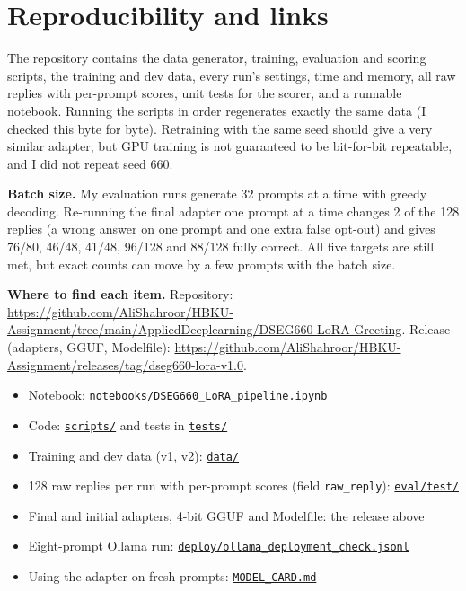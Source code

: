 \documentclass[11pt]{article}
\begin{document}
\section{Reproducibility and links}
The repository contains the data generator, training, evaluation and scoring scripts, the training and dev data, every run's settings, time and memory, all raw replies with per-prompt scores, unit tests for the scorer, and a runnable notebook.
Running the scripts in order regenerates exactly the same data (I checked this byte for byte). Retraining with the same seed should give a very similar adapter, but GPU training is not guaranteed to be bit-for-bit repeatable, and I did not repeat seed 660.

\textbf{Batch size.} My evaluation runs generate 32 prompts at a time with greedy decoding. Re-running the final adapter one prompt at a time changes 2 of the 128 replies (a wrong answer on one prompt and one extra false opt-out) and gives 76/80, 46/48, 41/48, 96/128 and 88/128 fully correct. All five targets are still met, but exact counts can move by a few prompts with the batch size.

\textbf{Where to find each item.}
Repository: \url{https://github.com/AliShahroor/HBKU-Assignment/tree/main/AppliedDeeplearning/DSEG660-LoRA-Greeting}.
Release (adapters, GGUF, Modelfile): \url{https://github.com/AliShahroor/HBKU-Assignment/releases/tag/dseg660-lora-v1.0}.
\begin{itemize}
\item Notebook: \href{https://github.com/AliShahroor/HBKU-Assignment/blob/main/AppliedDeeplearning/DSEG660-LoRA-Greeting/notebooks/DSEG660_LoRA_pipeline.ipynb}{\texttt{notebooks/\allowbreak DSEG660\_LoRA\_pipeline.ipynb}}
\item Code: \href{https://github.com/AliShahroor/HBKU-Assignment/tree/main/AppliedDeeplearning/DSEG660-LoRA-Greeting/scripts}{\texttt{scripts/}} and tests in \href{https://github.com/AliShahroor/HBKU-Assignment/tree/main/AppliedDeeplearning/DSEG660-LoRA-Greeting/tests}{\texttt{tests/}}
\item Training and dev data (v1, v2): \href{https://github.com/AliShahroor/HBKU-Assignment/tree/main/AppliedDeeplearning/DSEG660-LoRA-Greeting/data}{\texttt{data/}}
\item 128 raw replies per run with per-prompt scores (field \texttt{raw\_reply}): \href{https://github.com/AliShahroor/HBKU-Assignment/tree/main/AppliedDeeplearning/DSEG660-LoRA-Greeting/eval/test}{\texttt{eval/test/}}
\item Final and initial adapters, 4-bit GGUF and Modelfile: the release above
\item Eight-prompt Ollama run: \href{https://github.com/AliShahroor/HBKU-Assignment/blob/main/AppliedDeeplearning/DSEG660-LoRA-Greeting/deploy/ollama_deployment_check.jsonl}{\texttt{deploy/\allowbreak ollama\_deployment\_check.jsonl}}
\item Using the adapter on fresh prompts: \href{https://github.com/AliShahroor/HBKU-Assignment/blob/main/AppliedDeeplearning/DSEG660-LoRA-Greeting/MODEL_CARD.md}{\texttt{MODEL\_CARD.md}}
\end{itemize}


\end{document}

